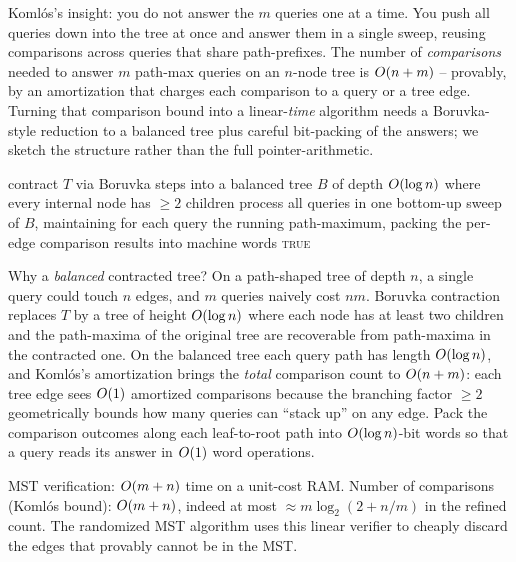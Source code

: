 \begin{intuitionbox}
Koml\'os's insight: you do not answer the $m$ queries one at a time. You push all queries down into the tree at once and answer them in a single sweep, reusing comparisons across queries that share path-prefixes. The number of \emph{comparisons} needed to answer $m$ path-max queries on an $n$-node tree is $O(n+m)$ -- provably, by an amortization that charges each comparison to a query or a tree edge. Turning that comparison bound into a linear-\emph{time} algorithm needs a Boruvka-style reduction to a balanced tree plus careful bit-packing of the answers; we sketch the structure rather than the full pointer-arithmetic.
\end{intuitionbox}

\begin{algorithm}[H]
\caption{MST-Verify (Koml\'os, structure)}
\label{ch06:verify-alg}
contract $T$ via Boruvka steps into a balanced tree $B$ of depth $O(\log n)$ where every internal node has $\ge 2$ children\;
process all queries in one bottom-up sweep of $B$, maintaining for each query the running path-maximum, packing the per-edge comparison results into machine words\;
\Return \textsc{true}\;
\end{algorithm}

\begin{whybox}
Why a \emph{balanced} contracted tree? On a path-shaped tree of depth $n$, a single query could touch $n$ edges, and $m$ queries naively cost $nm$. Boruvka contraction replaces $T$ by a tree of height $O(\log n)$ where each node has at least two children and the path-maxima of the original tree are recoverable from path-maxima in the contracted one. On the balanced tree each query path has length $O(\log n)$, and Koml\'os's amortization brings the \emph{total} comparison count to $O(n+m)$: each tree edge sees $O(1)$ amortized comparisons because the branching factor $\ge 2$ geometrically bounds how many queries can ``stack up'' on any edge. Pack the comparison outcomes along each leaf-to-root path into $O(\log n)$-bit words so that a query reads its answer in $O(1)$ word operations.
\end{whybox}

\begin{complexitybox}
MST verification: $O(m+n)$ time on a unit-cost RAM. Number of comparisons (Koml\'os bound): $O(m+n)$, indeed at most $\approx m\log_2(2 + n/m)$ in the refined count. The randomized MST algorithm uses this linear verifier to cheaply discard the edges that provably cannot be in the MST.
\end{complexitybox}

